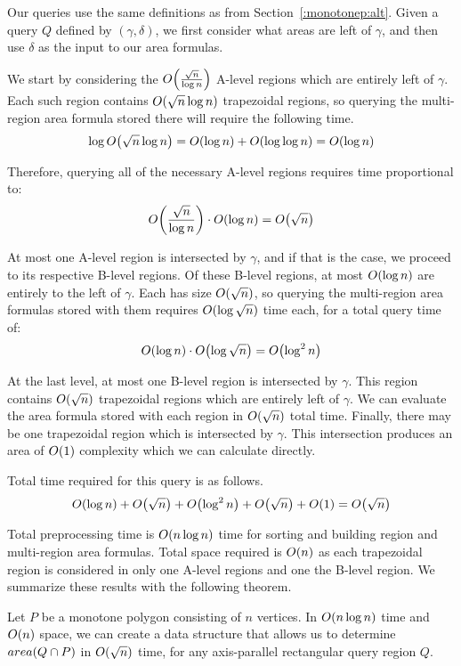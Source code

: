 Our queries use the same definitions as from Section~\ref{:monotonep:alt}. 
Given a query $Q$ defined by $(\gamma, \delta)$, we first consider what areas are left of $\gamma$, and then use $\delta$ as the input to our area formulas.

We start by considering the $O\!\left(\frac{\sqrt{n}}{\log{n}}\right)$ A-level regions which are entirely left of $\gamma$. 
Each such region contains $O\!\left(\sqrt{n}\log{n}\right)$ trapezoidal regions, so querying the multi-region area formula stored there will require the following time.
\[
\log{O\!\left(\sqrt{n}\log{n}\right)} = O\!\left(\log{n}\right) + O\!\left(\log{\log{n}}\right) = O\!\left(\log{n}\right)
\]

Therefore, querying all of the necessary A-level regions requires time proportional to:
\[
O\!\left(\frac{\sqrt{n}}{\log{n}}\right) \cdot O\!\left(\log{n}\right) = O\!\left(\sqrt{n}\right)
\]

At most one A-level region is intersected by $\gamma$, and if that is the case, we proceed to its respective B-level regions.
Of these B-level regions, at most $O\!\left(\log{n}\right)$ are entirely to the left of $\gamma$.
Each has size $O\!\left(\sqrt{n}\right)$, so querying the multi-region area formulas stored with them requires $O\!\left(\log{\sqrt{n}}\right)$ time each, for a total query time of:
\[
O\!\left(\log{n}\right) \cdot O\!\left(\log{\sqrt{n}}\right) = O\!\left(\log^2{n}\right)
\]

At the last level, at most one B-level region is intersected by $\gamma$. 
This region contains $O\!\left(\sqrt{n}\right)$ trapezoidal regions which are entirely left of $\gamma$.
We can evaluate the area formula stored with each region in $O\!\left(\sqrt{n}\right)$ total time.
Finally, there may be one trapezoidal region which is intersected by $\gamma$.
This intersection produces an area of $O\!\left(1\right)$ complexity which we can calculate directly.

Total time required for this query is as follows.
\[
O\!\left(\log{n}\right) + O\!\left(\sqrt{n}\right) + O\!\left(\log^2{n}\right) + O\!\left(\sqrt{n}\right) + O\!\left(1\right) = O\!\left(\sqrt{n}\right)
\]

Total preprocessing time is $O\!\left(n \log{n}\right)$ time for sorting and building region and multi-region area formulas.  Total space required is $O\!\left(n\right)$ as each trapezoidal region is considered in only one A-level regions and one the B-level region. We summarize these results with the following theorem.

\begin{theorem}
\label{th:mono2}
Let $P$ be a monotone polygon consisting of $n$ vertices. In $O\!\left(n \log{n}\right)$ time and $O\!\left(n\right)$ space, we can create a data structure that allows us to determine $area(Q \cap P)$ in $O\!\left(\sqrt{n}\right)$ time, for any axis-parallel rectangular query region $Q$.
\end{theorem}


